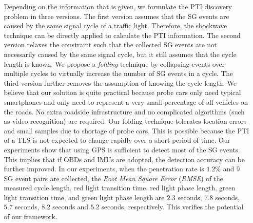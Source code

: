 \documentclass[final,oneside,onecolumn,12pt,a4paper]{book}%
\begin{document}
Depending on the information that is given, we formulate the PTI discovery
problem in three versions. The first version assumes that the SG events are
caused by the same signal cycle of a traffic light. Therefore, the shockwave
technique can be directly applied to calculate the PTI information. The second
version relaxes the constraint such that the collected SG events are not
necessarily caused by the same signal cycle, but it still assumes that the
cycle length is known. We propose a \emph{folding} technique by collapsing
events over multiple cycles to virtually increase the number of SG events in a
cycle. The third version further removes the assumption of knowing the cycle
length. We believe that our solution is quite practical because probe cars
only need typical smartphones and only need to represent a very small
percentage of all vehicles on the roads. No extra roadside infrastructure and
no
complicated algorithms (such as video recognition) are required. Our folding
technique tolerates location errors and small samples due to shortage of probe
cars. This is possible because the PTI of a TLS is not expected to change
rapidly over a short period of time. Our experiments show that using GPS is
sufficient to detect most of the SG events. This implies that if OBDs and IMUs
are adopted, the detection accuracy can be further improved.
In our experiments, when the penetration rate is $1.2\%$ and 9 SG event pairs
are collected, the \emph{Root Mean Square Error} (\emph{RMSE}) of the measured
cycle length, red light transition time, red light phase length, green light
transition time, and green light phase length are $2.3$ seconds, $7.8$
seconds, $5.7$ seconds, $8.2$ seconds and $5.2$ seconds, respectively. This
verifies the potential of our framework.
\end{document}

